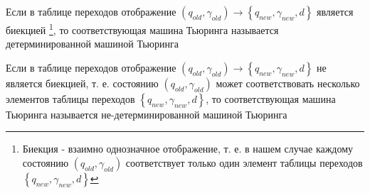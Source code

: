 \begin{definition}
Если в таблице переходов отображение
\(
\left(q_{old}, \gamma_{old}\right) \rightarrow 
\left\{q_{new}, \gamma_{new}, d\right\}
\)
является биекцией 
\footnote{Биекция - взаимно однозначное отображение, т. е. в нашем
  случае каждому состоянию $\left(q_{old}, \gamma_{old}\right)$
  соответствует только один элемент таблицы переходов 
  $\left\{q_{new}, \gamma_{new}, d\right\}$
},
то соответствующая машина Тьюринга
называется детерминированной машиной Тьюринга
\label{defAlgoDMT}
\end{definition}

\begin{definition}
Если в таблице переходов отображение
\(
\left(q_{old}, \gamma_{old}\right) \rightarrow 
\left\{q_{new}, \gamma_{new}, d\right\}
\)
не является биекцией, т. е. состоянию $\left(q_{old}, \gamma_{old}\right)$
может соответствовать несколько элементов таблицы переходов 
$\left\{q_{new}, \gamma_{new}, d\right\}$,
то соответствующая машина Тьюринга
называется не-детерминированной машиной Тьюринга
\label{defAlgoNDMT}
\end{definition}



